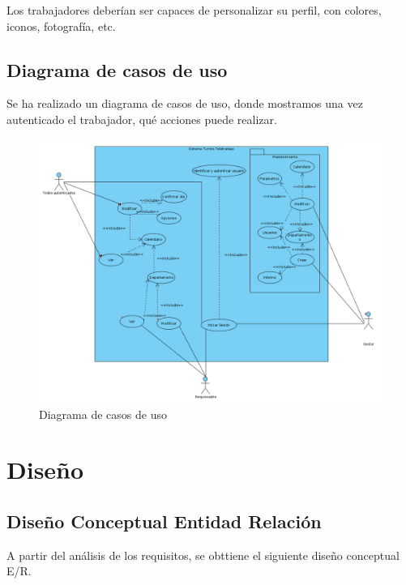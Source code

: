 \documentclass[11pt,spanish,listoffigures,listoftables]{tfgetsinf}
\begin{document}
Los trabajadores deberían ser capaces de personalizar su perfil, con colores, iconos, fotografía, etc.

\section{Diagrama de casos de uso}

Se ha realizado un diagrama de casos de uso, donde mostramos una vez autenticado el trabajador, qué acciones puede realizar.

\begin{figure}[h!] %
   \includegraphics[width=\linewidth]{img/Casos de uso.png}
   \caption{Diagrama de casos de uso}
   \label{fig:CasosUso1}
 \end{figure}

\chapter{Diseño}

\section{Diseño Conceptual Entidad Relación}
A partir del análisis de los requisitos, se obttiene el siguiente diseño conceptual E/R.
\end{document}
